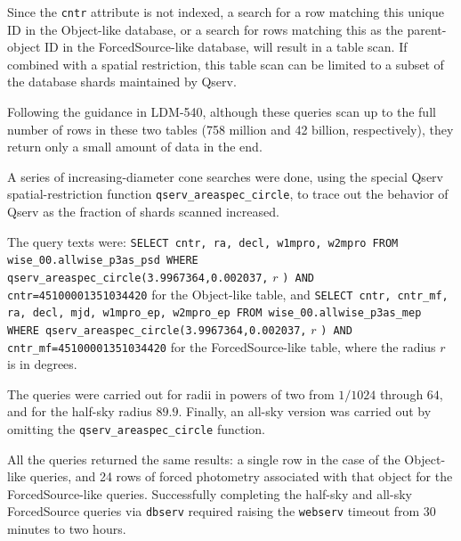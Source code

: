 Since the \verb|cntr| attribute is not indexed, a search for a row matching this unique ID in the Object-like database,
or a search for rows matching this as the parent-object ID in the ForcedSource-like database,
will result in a table scan.
If combined with a spatial restriction, this table scan can be limited to a subset of the database shards maintained by Qserv.

Following the guidance in LDM-540,
although these queries scan up to the full number of rows in these two tables (758 million and 42 billion, respectively),
they return only a small amount of data in the end.

A series of increasing-diameter cone searches were done,
using the special Qserv spatial-restriction function \verb|qserv_areaspec_circle|,
to trace out the behavior of Qserv as the fraction of shards scanned increased.

The query texts were:
\texttt{SELECT cntr, ra, decl, w1mpro, w2mpro FROM wise\_00.allwise\_p3as\_psd WHERE qserv\_areaspec\_circle(3.9967364,0.002037,} $r$ \texttt{) AND cntr=45100001351034420} for the Object-like table, and
\texttt{SELECT cntr, cntr\_mf, ra, decl, mjd, w1mpro\_ep, w2mpro\_ep FROM wise\_00.allwise\_p3as\_mep WHERE qserv\_areaspec\_circle(3.9967364,0.002037,} $r$ \texttt{) AND cntr\_mf=45100001351034420} for the ForcedSource-like table,
where the radius $r$ is in degrees.

The queries were carried out for radii in powers of two from $1/1024$ through $64$, and for the half-sky radius $89.9$.
Finally, an all-sky version was carried out by omitting the \verb|qserv_areaspec_circle| function.

All the queries returned the same results: a single row in the case of the Object-like queries,
and 24 rows of forced photometry associated with that object for the ForcedSource-like queries.
Successfully completing the half-sky and all-sky ForcedSource queries via \verb|dbserv| required raising the \verb|webserv|
timeout from 30 minutes to two hours.

